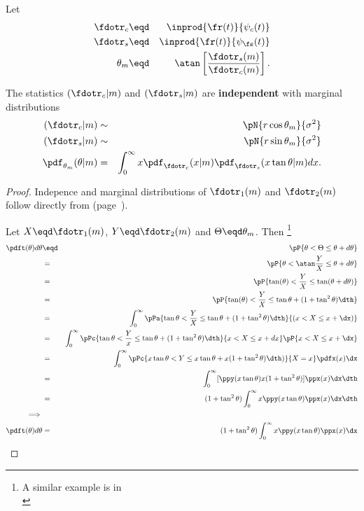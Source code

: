 \begin{theorem}
Let 
\begin{eqnarray*}
   \fdotr_c   &\eqd& \inprod{\fr(t)}{\psi_c(t)} \\
   \fdotr_s   &\eqd& \inprod{\fr(t)}{\psi_\fs(t)} \\
   \theta_m       &\eqd& \atan\left[\frac{\fdotr_s(m)}{\fdotr_c(m)}\right].
\end{eqnarray*}

The statistics $(\fdotr_c|m)$ and $(\fdotr_s|m)$ are {\bf independent} 
with marginal distributions
\begin{eqnarray*}
   (\fdotr_c|m) &\sim& \pN{r\cos\theta_m}{\sigma^2} \\
   (\fdotr_s|m) &\sim& \pN{r\sin\theta_m}{\sigma^2} \\
   \pdf_{\theta_m}(\theta|m)  &=&  \int_0^\infty x \pdf_{\fdotr_c}(x|m) 
                                                 \pdf_{\fdotr_s}(x\tan\theta|m) dx.
\end{eqnarray*}
\end{theorem}

\begin{proof}

Indepence and marginal distributions of $\fdotr_1(m)$ and $\fdotr_2(m)$
follow directly from 
 (page~\pageref{thm:ms_stats}).


Let $X\eqd\fdotr_1(m)$, $Y\eqd\fdotr_2(m)$ and $\Theta\eqd\theta_m$.
Then 
\footnote{ A similar example is in \\\cite[page 138]{papoulis}}
\begin{eqnarray*}
   \pdft(\theta)d\theta
     &\eqd& \pP{\theta < \Theta \le \theta + d\theta} 
   \\&=&    \pP{\theta < \atan\frac{Y}{X} \le \theta + d\theta} 
   \\&=&    \pP{\tan(\theta) < \frac{Y}{X} \le \tan(\theta + d\theta)} 
   \\&=&    \pP{\tan(\theta) < \frac{Y}{X} \le \tan\theta + (1+\tan^2\theta)\dth} 
   \\&=&    \int_0^\infty \pPa{\tan\theta < \frac{Y}{X} \le \tan\theta + (1+\tan^2\theta)\dth}{(x<X\le x+\dx)} 
   \\&=&    \int_0^\infty \pPc{\tan\theta < \frac{Y}{x} \le \tan\theta + (1+\tan^2\theta)\dth}{x<X\le x+dx}\pP{x<X\le x+\dx} 
   \\&=&    \int_0^\infty \pPc{x\tan\theta < Y \le x\tan\theta + x(1+\tan^2\theta)\dth)}{X=x} \pdfx(x)\dx 
   \\&=&    \int_0^\infty [\ppy(x\tan\theta)x(1+\tan^2\theta)] \ppx(x) \dx \dth
   \\&=&    (1+\tan^2\theta) \int_0^\infty x\ppy(x\tan\theta) \ppx(x) \dx \dth
\\\implies\\
   \pdft(\theta)d\theta
     &=& (1+\tan^2\theta) \int_0^\infty x\ppy(x\tan\theta) \ppx(x) \dx 
\end{eqnarray*}
\attention
\end{proof}



